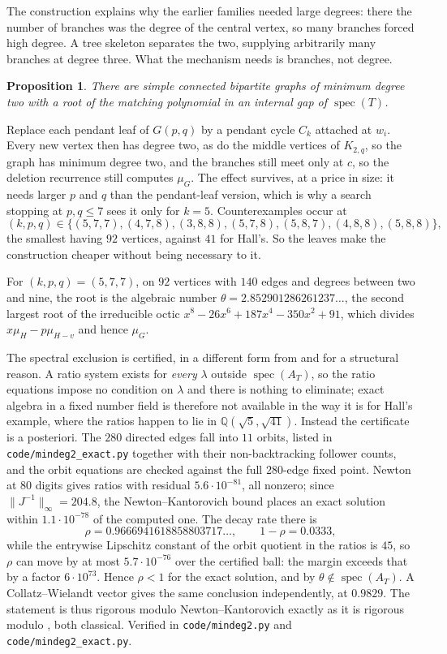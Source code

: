 \documentclass[11pt]{article}
\newtheorem{proposition}[theorem]{Proposition}
\theoremstyle{remark}
\begin{document}
The construction explains why the earlier families needed large degrees: there the number of
branches was the degree of the central vertex, so many branches forced high degree. A tree
skeleton separates the two, supplying arbitrarily many branches at degree three. What the
mechanism needs is branches, not degree.

\begin{proposition}\label{prop:mindeg2}
There are simple connected bipartite graphs of minimum degree two with a root of the matching
polynomial in an internal gap of $\operatorname{spec}(T)$.
\end{proposition}

Replace each pendant leaf of $G(p,q)$ by a pendant cycle $C_k$ attached at $w_i$. Every new
vertex then has degree two, as do the middle vertices of $K_{2,q}$, so the graph has minimum
degree two, and the branches still meet only at $c$, so the deletion recurrence still
computes $\mu_G$. The effect survives, at a price in size: it needs larger $p$ and $q$ than
the pendant-leaf version, which is why a search stopping at $p,q\le7$ sees it only for
$k=5$. Counterexamples occur at
\[
   (k,p,q)\in\{(5,7,7),(4,7,8),(3,8,8),(5,7,8),(5,8,7),(4,8,8),(5,8,8)\},
\]
the smallest having $92$ vertices, against $41$ for Hall's. So the leaves make the
construction cheaper without being necessary to it.

For $(k,p,q)=(5,7,7)$, on $92$ vertices with $140$ edges and degrees between two and nine,
the root is the algebraic number $\theta=2.852901286261237\ldots$, the second largest root of the
irreducible octic $x^8-26x^6+187x^4-350x^2+91$, which divides $x\mu_H-p\mu_{H-v}$ and hence
$\mu_G$.

The spectral exclusion is certified, in a different form from \cite{HallCE} and for a
structural reason. A ratio system exists for \emph{every} $\lambda$ outside
$\operatorname{spec}(A_T)$, so the ratio equations impose no condition on $\lambda$ and there
is nothing to eliminate; exact algebra in a fixed number field is therefore not available in
the way it is for Hall's example, where the ratios happen to lie in
$\mathbb{Q}(\sqrt5,\sqrt{41})$. Instead the certificate is a posteriori. The $280$ directed
edges fall into $11$ orbits, listed in \texttt{code/mindeg2\_exact.py} together with their
non-backtracking follower counts, and the orbit equations are checked against the full
$280$-edge fixed point. Newton at $80$ digits gives ratios with residual
$5.6\cdot10^{-81}$, all nonzero; since $\|J^{-1}\|_\infty=204.8$, the Newton--Kantorovich
bound places an exact solution within $1.1\cdot10^{-78}$ of the computed one. The decay rate
there is
\[
   \rho=0.9666941618858803717\ldots,\qquad 1-\rho=0.0333,
\]
while the entrywise Lipschitz constant of the orbit quotient in the ratios is $45$, so $\rho$
can move by at most $5.7\cdot10^{-76}$ over the certified ball: the margin exceeds that by a
factor $6\cdot10^{73}$. Hence $\rho<1$ for the exact solution, and by \cite{AFH}
$\theta\notin\operatorname{spec}(A_T)$. A Collatz--Wielandt vector gives the same conclusion
independently, at $0.9829$. The statement is thus rigorous modulo Newton--Kantorovich exactly
as it is rigorous modulo \cite{AFH}, both classical. Verified in \texttt{code/mindeg2.py} and
\texttt{code/mindeg2\_exact.py}.
\end{document}
